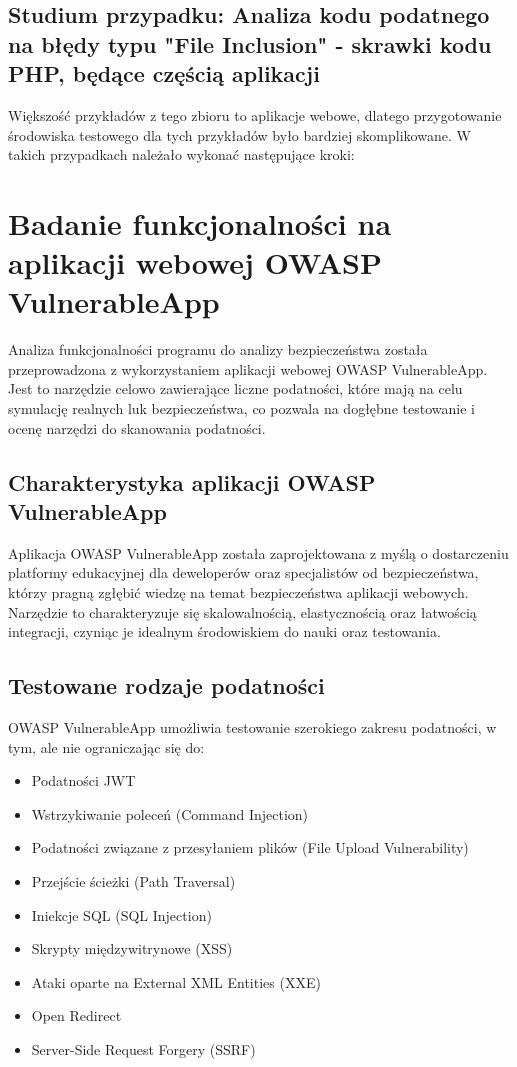 \section{Studium przypadku: Analiza kodu podatnego na błędy typu "File Inclusion" - skrawki kodu PHP, będące częścią aplikacji}
\label{sec:analiza_blednego_kodu_php}

Większość przykładów z tego zbioru to aplikacje webowe, dlatego przygotowanie środowiska testowego dla tych przykładów było bardziej skomplikowane. W takich przypadkach należało wykonać następujące kroki:

\chapter{Badanie funkcjonalności na aplikacji webowej OWASP VulnerableApp}
\label{sec:badania_na_aplikacji_webowej_owasp}

Analiza funkcjonalności programu do analizy bezpieczeństwa została przeprowadzona z wykorzystaniem aplikacji webowej OWASP VulnerableApp. Jest to narzędzie celowo zawierające liczne podatności, które mają na celu symulację realnych luk bezpieczeństwa, co pozwala na dogłębne testowanie i ocenę narzędzi do skanowania podatności.

\section{Charakterystyka aplikacji OWASP VulnerableApp}
Aplikacja OWASP VulnerableApp została zaprojektowana z myślą o dostarczeniu platformy edukacyjnej dla deweloperów oraz specjalistów od bezpieczeństwa, którzy pragną zgłębić wiedzę na temat bezpieczeństwa aplikacji webowych. Narzędzie to charakteryzuje się skalowalnością, elastycznością oraz łatwością integracji, czyniąc je idealnym środowiskiem do nauki oraz testowania.

\section{Testowane rodzaje podatności}
OWASP VulnerableApp umożliwia testowanie szerokiego zakresu podatności, w tym, ale nie ograniczając się do:

\begin{itemize}
    \item Podatności JWT
    \item Wstrzykiwanie poleceń (Command Injection)
    \item Podatności związane z przesyłaniem plików (File Upload Vulnerability)
    \item Przejście ścieżki (Path Traversal)
    \item Iniekcje SQL (SQL Injection)
    \item Skrypty międzywitrynowe (XSS)
    \item Ataki oparte na External XML Entities (XXE)
    \item Open Redirect
    \item Server-Side Request Forgery (SSRF)
\end{itemize}

